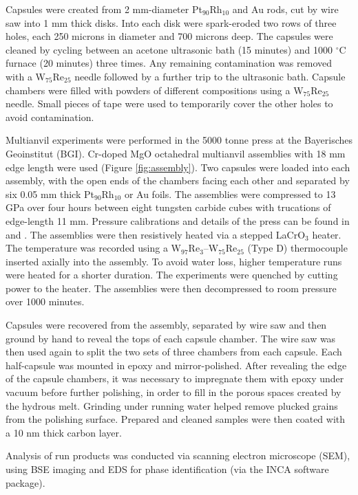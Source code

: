 \documentclass[review]{elsarticle}
\begin{document}
Capsules were created from 2 mm-diameter Pt$_{90}$Rh$_{10}$ and Au rods, cut by wire saw into 1 mm thick disks. Into each disk were spark-eroded two rows of three holes, each 250 microns in diameter and 700 microns deep. The capsules were cleaned by cycling between an acetone ultrasonic bath (15 minutes) and 1000 $^{\circ}$C furnace (20 minutes) three times. Any remaining contamination was removed with a W$_{75}$Re$_{25}$ needle followed by a further trip to the ultrasonic bath. Capsule chambers were filled with powders of different compositions using a W$_{75}$Re$_{25}$ needle. Small pieces of tape were used to temporarily cover the other holes to avoid contamination. 

Multianvil experiments were performed in the 5000 tonne press at the Bayerisches Geoinstitut (BGI). Cr-doped MgO octahedral multianvil assemblies with 18 mm edge length were used (Figure \ref{fig:assembly}). Two capsules were loaded into each assembly, with the open ends of the chambers facing each other and separated by six 0.05 mm thick Pt$_{90}$Rh$_{10}$ or Au foils. The assemblies were compressed to 13 GPa over four hours between eight tungsten carbide cubes with trucations of edge-length 11 mm. Pressure calibrations and details of the press can be found in \cite{FPTLDR2004} and \cite{KF2005}. The assemblies were then resistively heated via a stepped LaCrO$_3$ heater. The temperature was recorded using a W$_{97}$Re$_{3}$--W$_{75}$Re$_{25}$ (Type D) thermocouple inserted axially into the assembly. To avoid water loss, higher temperature runs were heated for a shorter duration. The experiments were quenched by cutting power to the heater. The assemblies were then decompressed to room pressure over 1000 minutes. 

Capsules were recovered from the assembly, separated by wire saw and then ground by hand to reveal the tops of each capsule chamber. The wire saw was then used again to split the two sets of three chambers from each capsule. Each half-capsule was mounted in epoxy and mirror-polished. After revealing the edge of the capsule chambers, it was necessary to impregnate them with epoxy under vacuum before further polishing, in order to fill in the porous spaces created by the hydrous melt. Grinding under running water helped remove plucked grains from the polishing surface. Prepared and cleaned samples were then coated with a 10 nm thick carbon layer.

Analysis of run products was conducted via scanning electron microscope (SEM), using BSE imaging and EDS for phase identification (via the INCA software package). 
\end{document}
